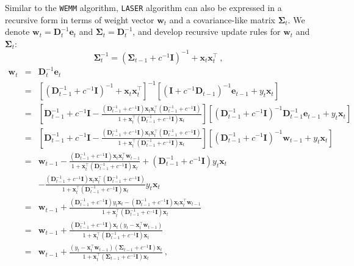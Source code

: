Similar to the \texttt{WEMM} algorithm, \texttt{LASER} algorithm can also be expressed in a recursive form in terms of weight vector $\mathbf{w}_{t}$ and a covariance-like matrix $\mathbf{\Sigma}_{t}$. We denote $\mathbf{w}_{t}=\mathbf{D}_{t}^{-1}\mathbf{e}_{t}$ and $\mathbf{\Sigma}_{t}=\mathbf{D}_{t}^{-1}$, and develop recursive update rules for $\mathbf{w}_{t}$ and $\mathbf{\Sigma}_{t}$:
\[
\mathbf{\Sigma}_{t}^{-1}=\left(\mathbf{\Sigma}_{t-1}+c^{-1}\mathbf{I}\right)^{-1}+\mathbf{x}_{t}\mathbf{x}_{t}^{\top}~,
\]
\begin{eqnarray*}
\mathbf{w}_{t} & = & \mathbf{D}_{t}^{-1}\mathbf{e}_{t}\\
 & = & \left[\left(\mathbf{D}_{t-1}^{-1}+c^{-1}\mathbf{I}\right)^{-1}+\mathbf{x}_{t}\mathbf{x}_{t}^{\top}\right]^{-1}\left[\left(\mathbf{I}+c^{-1}\mathbf{D}_{t-1}\right)^{-1}\mathbf{e}_{t-1}+y_{t}\mathbf{x}_{t}\right]\\
 & = & \left[\mathbf{D}_{t-1}^{-1}+c^{-1}\mathbf{I}-\frac{\left(\mathbf{D}_{t-1}^{-1}+c^{-1}\mathbf{I}\right)\mathbf{x}_{t}\mathbf{x}_{t}^{\top}\left(\mathbf{D}_{t-1}^{-1}+c^{-1}\mathbf{I}\right)}{1+\mathbf{x}_{t}^{\top}\left(\mathbf{D}_{t-1}^{-1}+c^{-1}\mathbf{I}\right)\mathbf{x}_{t}}\right]\left[\left(\mathbf{D}_{t-1}^{-1}+c^{-1}\mathbf{I}\right)^{-1}\mathbf{D}_{t-1}^{-1}\mathbf{e}_{t-1}+y_{t}\mathbf{x}_{t}\right]\\
 & = & \left[\mathbf{D}_{t-1}^{-1}+c^{-1}\mathbf{I}-\frac{\left(\mathbf{D}_{t-1}^{-1}+c^{-1}\mathbf{I}\right)\mathbf{x}_{t}\mathbf{x}_{t}^{\top}\left(\mathbf{D}_{t-1}^{-1}+c^{-1}\mathbf{I}\right)}{1+\mathbf{x}_{t}^{\top}\left(\mathbf{D}_{t-1}^{-1}+c^{-1}\mathbf{I}\right)\mathbf{x}_{t}}\right]\left[\left(\mathbf{D}_{t-1}^{-1}+c^{-1}\mathbf{I}\right)^{-1}\mathbf{w}_{t-1}+y_{t}\mathbf{x}_{t}\right]\\
 & = & \mathbf{w}_{t-1}-\frac{\left(\mathbf{D}_{t-1}^{-1}+c^{-1}\mathbf{I}\right)\mathbf{x}_{t}\mathbf{x}_{t}^{\top}\mathbf{w}_{t-1}}{1+\mathbf{x}_{t}^{\top}\left(\mathbf{D}_{t-1}^{-1}+c^{-1}\mathbf{I}\right)\mathbf{x}_{t}}+\left(\mathbf{D}_{t-1}^{-1}+c^{-1}\mathbf{I}\right)y_{t}\mathbf{x}_{t}\\
 &&-\frac{\left(\mathbf{D}_{t-1}^{-1}+c^{-1}\mathbf{I}\right)\mathbf{x}_{t}\mathbf{x}_{t}^{\top}\left(\mathbf{D}_{t-1}^{-1}+c^{-1}\mathbf{I}\right)}{1+\mathbf{x}_{t}^{\top}\left(\mathbf{D}_{t-1}^{-1}+c^{-1}\mathbf{I}\right)\mathbf{x}_{t}}y_{t}\mathbf{x}_{t}\\
 & = & \mathbf{w}_{t-1}+\frac{\left(\mathbf{D}_{t-1}^{-1}+c^{-1}\mathbf{I}\right)y_{t}\mathbf{x}_{t}-\left(\mathbf{D}_{t-1}^{-1}+c^{-1}\mathbf{I}\right)\mathbf{x}_{t}\mathbf{x}_{t}^{\top}\mathbf{w}_{t-1}}{1+\mathbf{x}_{t}^{\top}\left(\mathbf{D}_{t-1}^{-1}+c^{-1}\mathbf{I}\right)\mathbf{x}_{t}}\\
 & = & \mathbf{w}_{t-1}+\frac{\left(\mathbf{D}_{t-1}^{-1}+c^{-1}\mathbf{I}\right)\mathbf{x}_{t}\left(y_{t}-\mathbf{x}_{t}^{\top}\mathbf{w}_{t-1}\right)}{1+\mathbf{x}_{t}^{\top}\left(\mathbf{D}_{t-1}^{-1}+c^{-1}\mathbf{I}\right)\mathbf{x}_{t}}\\
 & = & \mathbf{w}_{t-1}+\frac{\left(y_{t}-\mathbf{x}_{t}^{\top}\mathbf{w}_{t-1}\right)\left(\mathbf{\Sigma}_{t-1}+c^{-1}\mathbf{I}\right)\mathbf{x}_{t}}{1+\mathbf{x}_{t}^{\top}\left(\mathbf{\Sigma}_{t-1}+c^{-1}\mathbf{I}\right)\mathbf{x}_{t}}
~,
\end{eqnarray*}
